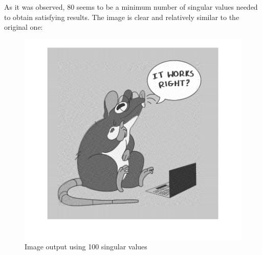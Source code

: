 As it was observed, 80 seems to be a minimum number of singular values needed
to obtain satisfying results. The image is clear and relatively similar to the original
one:
\begin{figure}
    \centering
    \includegraphics[width=0.5\linewidth]{figs/100_s_v.png}
    \caption{Image output using 100 singular values}
    \label{fig:100_s}
\end{figure}

